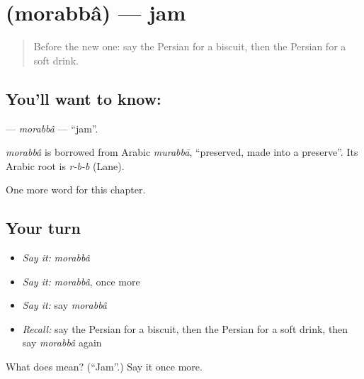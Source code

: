 \section[\texorpdfstring{\fa{مربا} (morabbâ)}{مربا (morabbâ)}]{ (morabbâ) — jam}

\label{lesson:FA-C167-morabba}



\begin{quote}
Before the new one: say the Persian for a biscuit, then the Persian for a soft drink.
\end{quote}

\subsection*{You'll want to know: }
\textbf{} — \emph{morabbâ} — \textquotedblleft{}jam\textquotedblright{}.

\begin{cousinweb}
\emph{morabbâ} is borrowed from Arabic \emph{murabbā}, \textquotedblleft{}preserved, made into a preserve\textquotedblright{}. Its Arabic root is \emph{r-b-b} (Lane).
\end{cousinweb}

\begin{grammarlens}[title={What you've built}]
One more word for this chapter.
\end{grammarlens}

\subsection*{Your turn}
\begin{itemize}
\raggedright
  \item \emph{Say it:} \emph{morabbâ}
  \item \emph{Say it:} \emph{morabbâ}, once more
  \item \emph{Say it:} say \emph{morabbâ}
  \item \emph{Recall:} say the Persian for a biscuit, then the Persian for a soft drink, then say \emph{morabbâ} again
\end{itemize}

\begin{tcolorbox}[breakable,colback=teal!4,colframe=teal!35!black,title={Before you move on}]
What does  mean? (\textquotedblleft{}Jam\textquotedblright{}.) Say it once more.
\end{tcolorbox}
